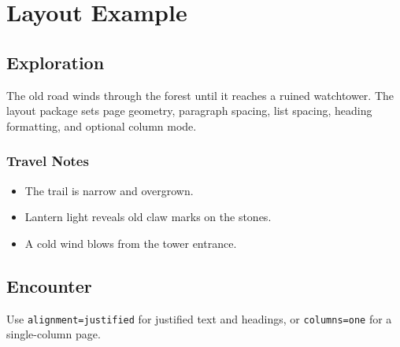 \documentclass{book}
\begin{document}
\chapter{Layout Example}

\section{Exploration}

The old road winds through the forest until it reaches a ruined watchtower.
The layout package sets page geometry, paragraph spacing, list spacing, heading
formatting, and optional column mode. \lipsum[1]

\subsection{Travel Notes}

\begin{itemize}
    \item The trail is narrow and overgrown.
    \item Lantern light reveals old claw marks on the stones.
    \item A cold wind blows from the tower entrance.
\end{itemize}

\section{Encounter}

Use \texttt{alignment=justified} for justified text and headings, or
\texttt{columns=one} for a single-column page. \lipsum[2]
\end{document}
